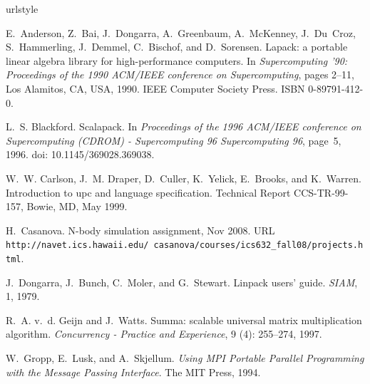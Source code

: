 \documentclass{sigplanconf}
\begin{document}
\begin{thebibliography}{18}
\providecommand{\natexlab}[1]{#1}
\providecommand{\url}[1]{\texttt{#1}}
\expandafter\ifx\csname urlstyle\endcsname\relax
  \providecommand{\doi}[1]{doi: #1}\else
  \providecommand{\doi}{doi: \begingroup \urlstyle{rm}\Url}\fi

E.~Anderson, Z.~Bai, J.~Dongarra, A.~Greenbaum, A.~McKenney, J.~Du~Croz,
  S.~Hammerling, J.~Demmel, C.~Bischof, and D.~Sorensen.
\newblock Lapack: a portable linear algebra library for high-performance
  computers.
\newblock In \emph{Supercomputing {'}90: Proceedings of the 1990 ACM/IEEE
  conference on Supercomputing}, pages 2--11, Los Alamitos, CA, USA, 1990. IEEE
  Computer Society Press.
\newblock ISBN 0-89791-412-0.

L.~S. Blackford.
\newblock Scalapack.
\newblock In \emph{Proceedings of the 1996 ACM/IEEE conference on
  Supercomputing (CDROM) - Supercomputing 96 Supercomputing 96}, page~5, 1996.
\newblock \doi{10.1145/369028.369038}.

W.~W. Carlson, J.~M. Draper, D.~Culler, K.~Yelick, E.~Brooks, and K.~Warren.
\newblock Introduction to upc and language specification.
\newblock Technical Report CCS-TR-99-157, Bowie, MD, May 1999.

H.~Casanova.
\newblock N-body simulation assignment, Nov 2008.
\newblock URL
  \url{http://navet.ics.hawaii.edu/~casanova/courses/ics632_fall08/projects.html}.

J.~Dongarra, J.~Bunch, C.~Moler, and G.~Stewart.
\newblock Linpack users' guide.
\newblock \emph{SIAM}, 1, 1979.

R.~A. v.~d. Geijn and J.~Watts.
\newblock Summa: scalable universal matrix multiplication algorithm.
\newblock \emph{Concurrency - Practice and Experience}, 9
  (4): 255--274, 1997.

W.~Gropp, E.~Lusk, and A.~Skjellum.
\newblock \emph{Using MPI Portable Parallel Programming with the Message
  Passing Interface}.
\newblock The MIT Press, 1994.


\end{thebibliography}
\end{document}
